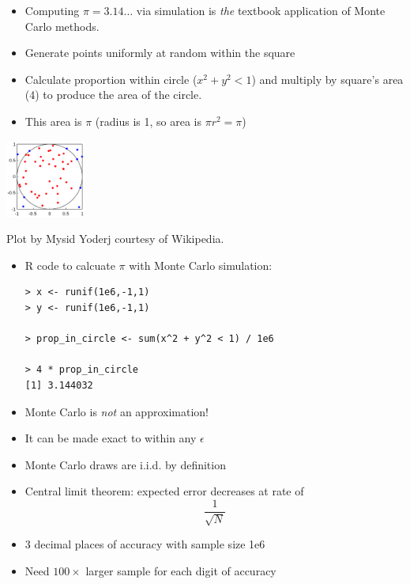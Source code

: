 \documentclass[10pt]{report}
\begin{document}


\noindent
\begin{minipage}[t]{0.65\textwidth}\small
\vspace*{2pt}
\begin{itemize}
\item Computing $\pi = 3.14\ldots$ via simulation is \emph{the} textbook application
of Monte Carlo methods.
\vfill
\item Generate points uniformly at random within the square
\item Calculate proportion within circle ($x^2 + y^2 < 1$) and multiply by square's area (4) to produce the area of the circle.
\item This area is $\pi$ (radius is 1, so area is $\pi r^2 = \pi$)
\end{itemize}
\end{minipage}
%
\begin{minipage}[t]{0.34\textwidth}
\vspace*{12pt}
\hfill \includegraphics[height=1in]{img/mc-integration-wikipedia.png}
\\
\end{minipage}
\vfill
{ } \hfill {\tiny Plot by Mysid Yoderj courtesy of Wikipedia.}

%
\begin{itemize}
\item R code to calcuate $\pi$ with Monte Carlo simulation:
\\[-8pt]
{\small
\begin{Verbatim}
> x <- runif(1e6,-1,1)
> y <- runif(1e6,-1,1)

> prop_in_circle <- sum(x^2 + y^2 < 1) / 1e6

> 4 * prop_in_circle
[1] 3.144032
\end{Verbatim}
}
\end{itemize}

\begin{itemize}
\item Monte Carlo is \emph{not} an approximation!
\item It can be made exact to within any $\epsilon$
\item Monte Carlo draws are i.i.d. by definition
\item Central limit theorem: expected error decreases at rate of
{\Large
\[
\frac{1}{\sqrt{N}}
\]
}
\item 3 decimal places of accuracy with 
sample size 1e6
\item Need $100 \times$ larger sample for each digit of accuracy
\end{itemize}
\end{document}
